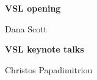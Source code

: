 \documentclass[a3paper]{article}
\begin{document}
\printGenericVSLHeaderBig
\begin{center}
\begin{vsltext}{3cm}{3.5cm}

    \vspace{1.5cm}

    \textbf{VSL opening} 

    Dana Scott 

    \vspace{2cm}

    \textbf{VSL keynote talks}

    Christos Papadimitriou

\end{vsltext}

\end{center}
\end{document}
